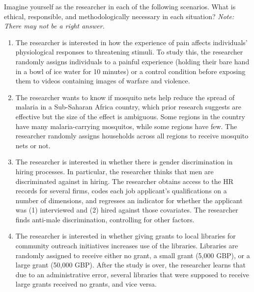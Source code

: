 \documentclass[12pt,a4]{article}
\begin{document}
\thispagestyle{empty}


\vspace{1em} 
\noindent Imagine yourself as the researcher in each of the following scenarios. What is ethical, responsible, and methodologically necessary in each situation? {\em Note: There may not be a right answer.}

\begin{enumerate}\itemsep1em

\item The researcher is interested in how the experience of pain affects individuals' physiological responses to threatening stimuli. To study this, the researcher randomly assigns individuals to a painful experience (holding their bare hand in a bowl of ice water for 10 minutes) or a control condition before exposing them to videos containing images of warfare and violence. %

\item The researcher wants to know if mosquito nets help reduce the spread of malaria in a Sub-Saharan Africa country, which prior research suggests are effective but the size of the effect is ambiguous. Some regions in the country have many malaria-carrying mosquitos, while some regions have few. The researcher randomly assigns households across all regions to receive mosquito nets or not. %

\item The researcher is interested in whether there is gender discrimination in hiring processes. In particular, the researcher thinks that men are discriminated against in hiring. The researcher obtains access to the HR records for several firms, codes each job applicant's qualifications on a number of dimensions, and regresses an indicator for whether the applicant was (1) interviewed and (2) hired against those covariates. The researcher finds anti-male discrimination, controlling for other factors.

\item The researcher is interested in whether giving grants to local libraries for community outreach initiatives increases use of the libraries. Libraries are randomly assigned to receive either no grant, a small grant (5,000 GBP), or a large grant (50,000 GBP). After the study is over, the researcher learns that due to an administrative error, several libraries that were supposed to receive large grants received no grants, and vice versa. %


\end{enumerate}
\end{document}
